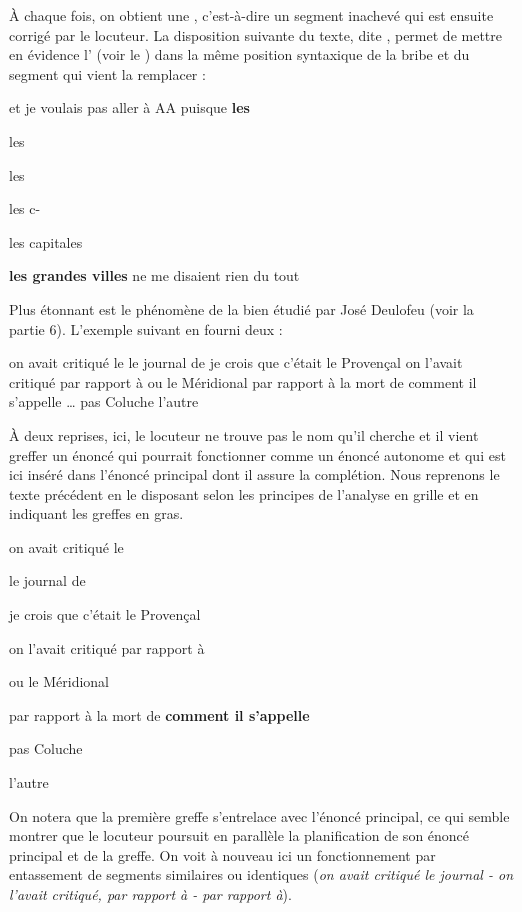 À chaque fois, on obtient une , c’est-à-dire un segment inachevé qui est ensuite corrigé par le locuteur. La disposition suivante du texte, dite , permet de mettre en évidence l’ (voir le ) dans la même position syntaxique de la bribe et du segment qui vient la remplacer :

\ea
et je voulais pas aller à AA puisque   \textbf{les}

  les

  les

  les c-

  les capitales

  \textbf{les grandes villes} ne me disaient rien du tout

\z

Plus étonnant est le phénomène de la  bien étudié par José Deulofeu (voir la partie 6). L’exemple suivant en fourni deux :

\ea
on avait critiqué le le journal de je crois que c’était le Provençal on l’avait critiqué par rapport à ou le Méridional par rapport à la mort de comment il s’appelle … pas Coluche l’autre

\z

À deux reprises, ici, le locuteur ne trouve pas le nom qu’il cherche et il vient greffer un énoncé qui pourrait fonctionner comme un énoncé autonome et qui est ici inséré dans l’énoncé principal dont il assure la complétion. Nous reprenons le texte précédent en le disposant selon les principes de l’analyse en grille et en indiquant les greffes en gras.

\ea
on avait critiqué  le

    le journal de

   je crois que c’était    le Provençal

on l’avait critiqué   par rapport à

  ou le Méridional

   par rapport à la mort de    \textbf{comment il s’appelle}

  pas Coluche

  l’autre

\z

On notera que la première greffe s’entrelace avec l’énoncé principal, ce qui semble montrer que le locuteur poursuit en parallèle la planification de son énoncé principal et de la greffe. On voit à nouveau ici un fonctionnement par entassement de segments similaires ou identiques (\textit{on avait critiqué le journal - on l’avait critiqué, par rapport à - par rapport à}).

